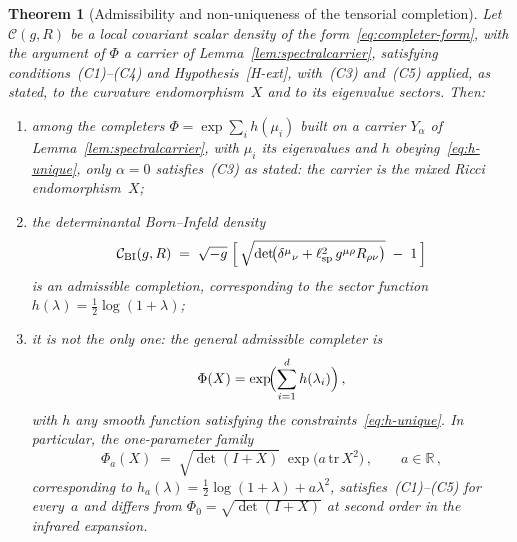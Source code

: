 \documentclass[pdflatex,sn-mathphys-num]{sn-jnl} %
\theoremstyle{remark}
\theoremstyle{plain}
\newtheorem{theorem}{Theorem}
\begin{document}
    \begin{theorem}[Admissibility and non-uniqueness of the
    tensorial completion]
      \label{thm:uniqueness-completion}
      Let $\mathcal{C}(g, R)$ be a local covariant scalar
      density of the form~\eqref{eq:completer-form}, with the argument of $\Phi$ a carrier of
      Lemma~\ref{lem:spectralcarrier},
      satisfying conditions~\textup{(C1)--(C4)} and
      Hypothesis~\textup{[H-ext]}, with~\textup{(C3)} and~\textup{(C5)} applied, as stated, to the curvature
      endomorphism~$X$ and to its eigenvalue sectors.
      Then:
      \begin{enumerate}
        \item[\textup{(o)}]
        among the completers $\Phi = \exp\sum_i h(\mu_i)$ built on a carrier $Y_\alpha$ of
        Lemma~\ref{lem:spectralcarrier}, with $\mu_i$ its eigenvalues and $h$ obeying~\eqref{eq:h-unique}, only
        $\alpha = 0$ satisfies~\textup{(C3)} as stated: the carrier is the mixed Ricci endomorphism~$X$;

        \item[\textup{(i)}]
        the determinantal Born--Infeld density
        \begin{equation}\label{eq:unique-completer}
          \mathcal{C}_{\mathrm{BI}}(g, R)
          \;=\;
          \sqrt{-g}\;
          \Bigl[\,
          \sqrt{\det\!\bigl(
          \delta^{\mu}{}_{\nu}
          + \ell_{\mathrm{sp}}^{2}\,
          g^{\mu\rho} R_{\rho\nu}
          \bigr)}
          \;-\; 1
          \,\Bigr]
        \end{equation}
        is an admissible completion, corresponding to the
        sector function
        $h(\lambda) = \tfrac12\log(1+\lambda)$;

        \item[\textup{(ii)}]
        it is not the only one: the general admissible
        completer is
        \begin{equation}\label{eq:general-completer}
          \Phi(X)
          = \exp\!\Bigl(\sum_{i=1}^{d} h(\lambda_i)\Bigr)\,,
        \end{equation}
        with $h$ any smooth function satisfying the
        constraints~\eqref{eq:h-unique}.
        In particular, the one-parameter family
        \begin{equation}\label{eq:counterexample-family}
          \Phi_a(X)
          \;=\;
          \sqrt{\det(I + X)}\;
          \exp\!\bigl(a\,\mathrm{tr}\,X^2\bigr)\,,
          \qquad a \in \mathbb{R}\,,
        \end{equation}
        corresponding to
        $h_a(\lambda) = \tfrac12\log(1+\lambda)
        + a\lambda^2$, satisfies~\textup{(C1)--(C5)} for
        every~$a$ and differs from
        $\Phi_0 = \sqrt{\det(I+X)}$ at second order in the
        infrared expansion.
      \end{enumerate}
    \end{theorem}
\end{document}
